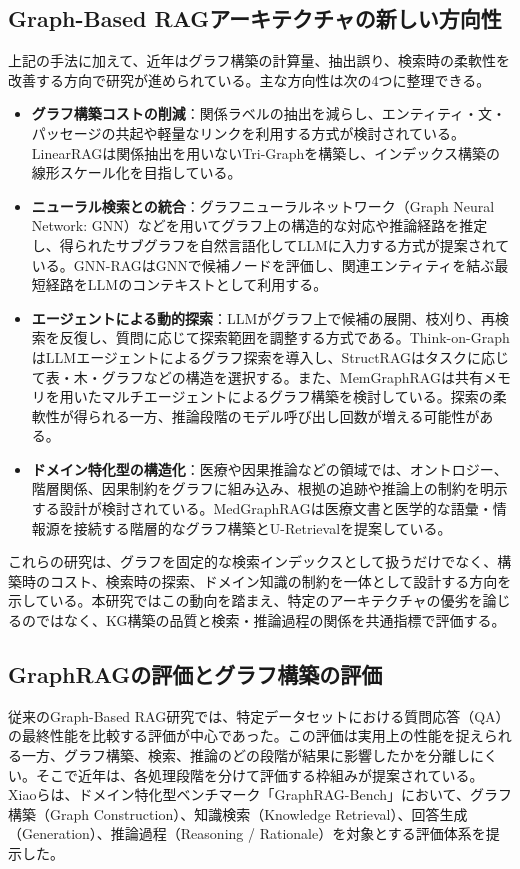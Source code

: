 \documentclass[a4j,dvipdfmx]{jsarticle}
\begin{document}
\subsection{Graph-Based RAGアーキテクチャの新しい方向性}
上記の手法に加えて、近年はグラフ構築の計算量、抽出誤り、検索時の柔軟性を改善する方向で研究が進められている\cite{pan2024unifying}。主な方向性は次の4つに整理できる。
\begin{itemize}
    \item \textbf{グラフ構築コストの削減}：関係ラベルの抽出を減らし、エンティティ・文・パッセージの共起や軽量なリンクを利用する方式が検討されている。LinearRAGは関係抽出を用いないTri-Graphを構築し、インデックス構築の線形スケール化を目指している\cite{zhuang2025linearrag}。
    \item \textbf{ニューラル検索との統合}：グラフニューラルネットワーク（Graph Neural Network: GNN）などを用いてグラフ上の構造的な対応や推論経路を推定し、得られたサブグラフを自然言語化してLLMに入力する方式が提案されている。GNN-RAGはGNNで候補ノードを評価し、関連エンティティを結ぶ最短経路をLLMのコンテキストとして利用する\cite{mavromatis2025gnnrag}。
    \item \textbf{エージェントによる動的探索}：LLMがグラフ上で候補の展開、枝刈り、再検索を反復し、質問に応じて探索範囲を調整する方式である。Think-on-GraphはLLMエージェントによるグラフ探索を導入し\cite{sun2023thinkongraph}、StructRAGはタスクに応じて表・木・グラフなどの構造を選択する\cite{li2024structrag}。また、MemGraphRAGは共有メモリを用いたマルチエージェントによるグラフ構築を検討している\cite{xiang2026memgraphrag}。探索の柔軟性が得られる一方、推論段階のモデル呼び出し回数が増える可能性がある。
    \item \textbf{ドメイン特化型の構造化}：医療や因果推論などの領域では、オントロジー、階層関係、因果制約をグラフに組み込み、根拠の追跡や推論上の制約を明示する設計が検討されている。MedGraphRAGは医療文書と医学的な語彙・情報源を接続する階層的なグラフ構築とU-Retrievalを提案している\cite{wu2024medicalgraphrag}。
\end{itemize}
これらの研究は、グラフを固定的な検索インデックスとして扱うだけでなく、構築時のコスト、検索時の探索、ドメイン知識の制約を一体として設計する方向を示している。本研究ではこの動向を踏まえ、特定のアーキテクチャの優劣を論じるのではなく、KG構築の品質と検索・推論過程の関係を共通指標で評価する。

\subsection{GraphRAGの評価とグラフ構築の評価}
従来のGraph-Based RAG研究では、特定データセットにおける質問応答（QA）の最終性能を比較する評価が中心であった。この評価は実用上の性能を捉えられる一方、グラフ構築、検索、推論のどの段階が結果に影響したかを分離しにくい。そこで近年は、各処理段階を分けて評価する枠組みが提案されている。
Xiaoら\cite{xiao2025graphragbench}は、ドメイン特化型ベンチマーク「GraphRAG-Bench」において、グラフ構築（Graph Construction）、知識検索（Knowledge Retrieval）、回答生成（Generation）、推論過程（Reasoning / Rationale）を対象とする評価体系を提示した。
\end{document}
